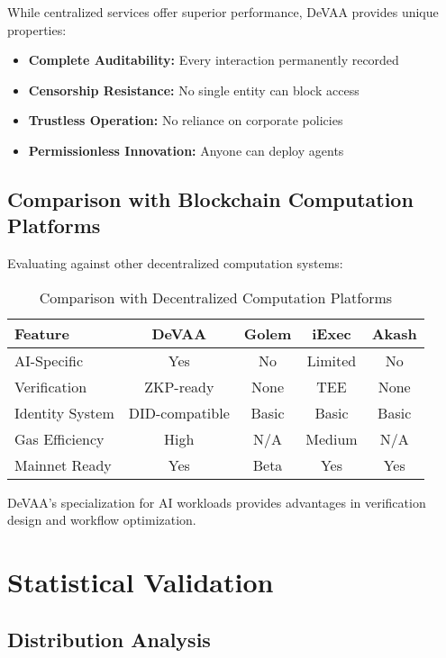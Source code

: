 While centralized services offer superior performance, DeVAA provides unique properties:
\begin{itemize}
    \item \textbf{Complete Auditability:} Every interaction permanently recorded
    \item \textbf{Censorship Resistance:} No single entity can block access
    \item \textbf{Trustless Operation:} No reliance on corporate policies
    \item \textbf{Permissionless Innovation:} Anyone can deploy agents
\end{itemize}

\subsection{Comparison with Blockchain Computation Platforms}

Evaluating against other decentralized computation systems:

\begin{table}[h]
\centering
\caption{Comparison with Decentralized Computation Platforms}
\label{tab:decentralized-comparison}
\begin{tabular}{lcccc}
\toprule
\textbf{Feature} & \textbf{DeVAA} & \textbf{Golem} & \textbf{iExec} & \textbf{Akash} \\
\midrule
AI-Specific & Yes & No & Limited & No \\
Verification & ZKP-ready & None & TEE & None \\
Identity System & DID-compatible & Basic & Basic & Basic \\
Gas Efficiency & High & N/A & Medium & N/A \\
Mainnet Ready & Yes & Beta & Yes & Yes \\
\bottomrule
\end{tabular}
\end{table}

DeVAA's specialization for AI workloads provides advantages in verification design and workflow optimization.

\section{Statistical Validation}

\subsection{Distribution Analysis}

